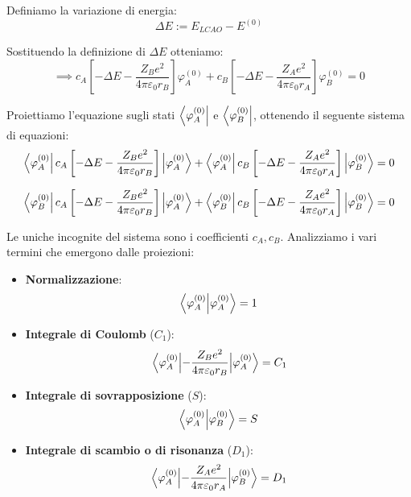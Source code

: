 Definiamo la variazione di energia:
\begin{equation}
    \Delta E := E_{LCAO} - E^{(0)}
\end{equation}

Sostituendo la definizione di \( \Delta E \) otteniamo:
\begin{equation}
    \implies c_A \left[ -\Delta E - \frac{Z_B e^2}{4\pi\varepsilon_0 r_B} \right] \varphi_A^{(0)} + c_B \left[ -\Delta E - \frac{Z_A e^2}{4\pi\varepsilon_0 r_A} \right] \varphi_B^{(0)} = 0
\end{equation}

Proiettiamo l'equazione sugli stati \( \bra{\varphi_A^{(0)}} \) e \( \bra{\varphi_B^{(0)}} \), ottenendo il seguente sistema di equazioni:
\begin{align}
    \bra{\varphi_A^{(0)}} c_A \left[ -\Delta E - \frac{Z_B e^2}{4\pi\varepsilon_0 r_B} \right] \ket{\varphi_A^{(0)}} + \bra{\varphi_A^{(0)}} c_B \left[ -\Delta E - \frac{Z_A e^2}{4\pi\varepsilon_0 r_A} \right] \ket{\varphi_B^{(0)}} &= 0 \\[1.5ex]
    \bra{\varphi_B^{(0)}} c_A \left[ -\Delta E - \frac{Z_B e^2}{4\pi\varepsilon_0 r_B} \right] \ket{\varphi_A^{(0)}} + \bra{\varphi_B^{(0)}} c_B \left[ -\Delta E - \frac{Z_A e^2}{4\pi\varepsilon_0 r_A} \right] \ket{\varphi_B^{(0)}} &= 0
\end{align}

Le uniche incognite del sistema sono i coefficienti \( c_A, c_B \). 
Analizziamo i vari termini che emergono dalle proiezioni:
\begin{itemize}
    \item \textbf{Normalizzazione}:
    \begin{equation}
        \braket{\varphi_A^{(0)}}{\varphi_A^{(0)}} = 1
    \end{equation}
    
    \item \textbf{Integrale di Coulomb} (\( C_1 \)):
    \begin{equation}
        \mel{\varphi_A^{(0)}}{-\frac{Z_B e^2}{4\pi\varepsilon_0 r_B}}{\varphi_A^{(0)}} = C_1
    \end{equation}
    
    \item \textbf{Integrale di sovrapposizione} (\( S \)):
    \begin{equation}
        \braket{\varphi_A^{(0)}}{\varphi_B^{(0)}} = S
    \end{equation}
    
    \item \textbf{Integrale di scambio o di risonanza} (\( D_1 \)):
    \begin{equation}
        \mel{\varphi_A^{(0)}}{-\frac{Z_A e^2}{4\pi\varepsilon_0 r_A}}{\varphi_B^{(0)}} = D_1
    \end{equation}
\end{itemize}

